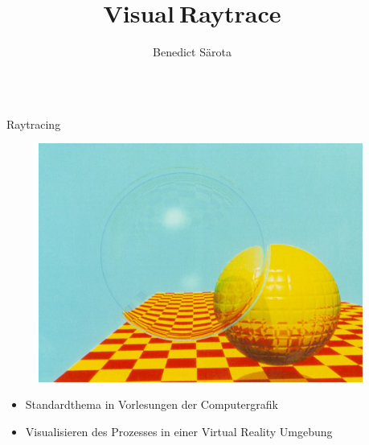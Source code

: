 \documentclass[final,hyperref={pdfpagelabels=false}]{beamer}
\title{\huge Visual$\:$Raytrace}
\author{Benedict S\"arota}
\institute{Fachbereich Informatik und Mikrosystemtechnik}
\begin{document}

\begin{frame}[t] %

\begin{columns}[t] %

\begin{column}{.025\textwidth}\end{column} %

\begin{column}{.465\textwidth} %


\begin{block}{Raytracing}
    \begin{figure}
    	\center
        \includegraphics[width=0.875\linewidth]{whitted02}
    \end{figure}
    

	\begin{itemize}
	 	\item Standardthema in Vorlesungen der Computergrafik 
	 	\item Visualisieren des Prozesses in einer Virtual Reality Umgebung
	\end{itemize}


\end{block}
\end{column}
\end{columns}
\end{frame}
\end{document}
